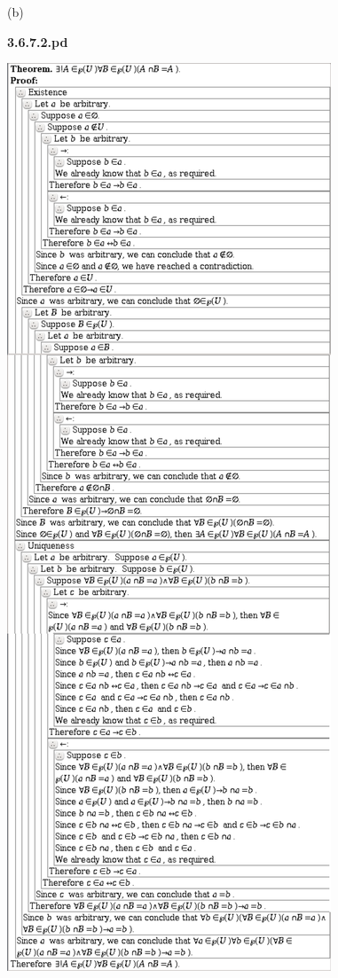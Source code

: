 \documentclass{article}
\begin{document}
\vspace{30pt}

(b)

\textbf{3.6.7.2.pd}
\vspace{10pt}

\includegraphics[scale=0.12]{3_6_7_2}
\end{document}
